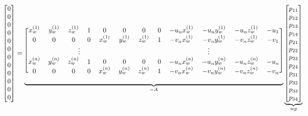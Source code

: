 \setcounter{MaxMatrixCols}{20}
\begin{equation} 
    \scalemath{0.9}{
        \begin{bmatrix}
            0 \\ 0 \\ 0 \\ 0 \\ 0 \\ 0 \\ 0 \\ 0 \\ 0 \\ 0 \\ 0 \\ 0
        \end{bmatrix}
        =
        \underbrace{
            \begin{blockarray}{[*{12}c]}
                x_w^{(1)} & y_w^{(1)} & z_w^{(1)} & 1 & 0         & 0         & 0         & 0 & -u_nx_w^{(1)} & -u_ny_w^{(1)} & -u_nz_w^{(1)} & -u_1 \\
                0         & 0         & 0         & 0 & x_w^{(1)} & y_w^{(1)} & z_w^{(1)} & 1 & -v_nx_w^{(1)} & -v_ny_w^{(1)} & -v_nz_w^{(1)} & -v_1 \\
                \BAmulticolumn{6}{c}{\vdots} & \BAmulticolumn{6}{c}{\vdots} \\
                x_w^{(n)} & y_w^{(n)} & z_w^{(n)} & 1 & 0         & 0         & 0         & 0 & -u_nx_w^{(n)} & -u_ny_w^{(n)} & -u_nz_w^{(n)} & -u_n \\
                0         & 0         & 0         & 0 & x_w^{(n)} & y_w^{(n)} & z_w^{(n)} & 1 & -v_nx_w^{(n)} & -v_ny_w^{(n)} & -v_nz_w^{(n)} & -v_n
            \end{blockarray}
        }_{=A}
        \underbrace{
            \begin{bmatrix}
                p_{11} \\ p_{12} \\ p_{13} \\ p_{14} \\ p_{21} \\ p_{22} \\ p_{23} \\ p_{24} \\ p_{31} \\ p_{32} \\ p_{33} \\ p_{34}
            \end{bmatrix}
        }_{=p}
    }
\end{equation}





